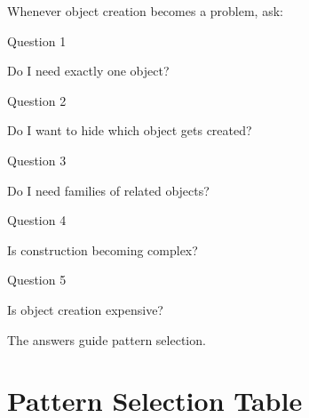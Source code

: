 \documentclass[11pt,a4paper]{book}
\begin{document}
Whenever object creation becomes
a problem, ask:


Question 1


Do I need exactly one object?


Question 2


Do I want to hide which object
gets created?


Question 3


Do I need families of related
objects?


Question 4


Is construction becoming complex?


Question 5


Is object creation expensive?


The answers guide pattern selection.


\section{Pattern Selection Table}
\end{document}
